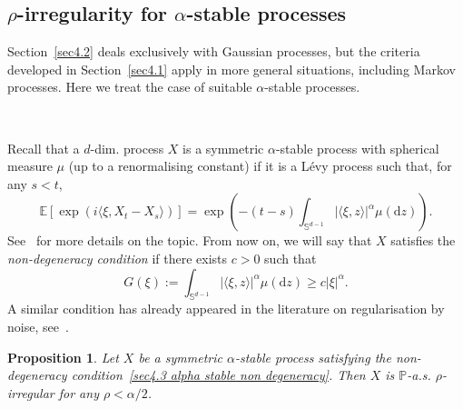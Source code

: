 \documentclass[10pt]{article}
\newcommand{\assign}{:=}
\newcommand{\mathd}{\mathrm{d}}
\newcommand{\tmtextit}[1]{{\itshape{#1}}}
\newtheorem{proposition}[theorem]{Proposition}
{\theorembodyfont{\rmfamily}\newtheorem{remark}[theorem]{Remark}}
\begin{document}
\subsection{$\rho$\mbox{-}irregularity for $\alpha$\mbox{-}stable
processes}\label{sec4.3}

Section~\ref{sec4.2} deals exclusively with Gaussian processes, but the
criteria developed in Section~\ref{sec4.1} apply in more general situations,
including Markov processes. Here we treat the case of suitable
$\alpha$\mbox{-}stable processes.

\

Recall that a $d$-dim. process $X$ is a symmetric $\alpha$-stable process
with spherical measure $\mu$ (up to a renormalising constant) if it is a
L{\'e}vy process such that, for any $s < t$,
\[ \mathbb{E} [\exp (i \langle \xi, X_t - X_s \rangle)] = \exp \left( - (t -
   s) \int_{\mathbb{S}^{d - 1}} | \langle \xi, z \rangle |^{\alpha} \mu
   (\mathd z) \right) . \]
See~{\cite{sato}} for more details on the topic. From now on, we will say that
$X$ satisfies the \tmtextit{non\mbox{-}degeneracy condition} if there exists
$c > 0$ such that
\begin{equation}
  G (\xi) \assign \int_{\mathbb{S}^{d - 1}} | \langle \xi, z \rangle
  |^{\alpha} \mu (\mathd z) \geqslant c | \xi |^{\alpha} . \label{sec4.3 alpha
  stable non degeneracy}
\end{equation}
A similar condition has already appeared in the literature on regularisation
by noise, see~{\cite{priola2020}}.

\begin{proposition}
  \label{sec4.3 prop rho irr alpha}Let $X$ be a symmetric $\alpha$-stable
  process satisfying the non\mbox{-}degeneracy condition~{\eqref{sec4.3 alpha
  stable non degeneracy}}. Then $X$ is $\mathbb{P}$-a.s. $\rho$-irregular for
  any $\rho < \alpha / 2$.
\end{proposition}
\end{document}
